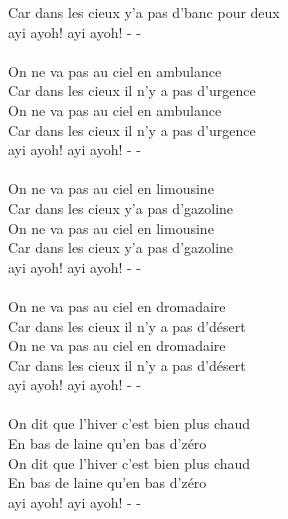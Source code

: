 Car dans les cieux y'a pas d'banc pour deux\\
ayi ayoh! ayi ayoh! - -\\\\
On ne va pas au ciel en ambulance\\
Car dans les cieux il n'y a pas d’urgence\\
On ne va pas au ciel en ambulance\\
Car dans les cieux il n'y a pas d’urgence\\
ayi ayoh! ayi ayoh! - -\\\\
On ne va pas au ciel en limousine\\
Car dans les cieux y'a pas d’gazoline\\
On ne va pas au ciel en limousine\\
Car dans les cieux y'a pas d’gazoline\\
ayi ayoh! ayi ayoh! - -\\\\
On ne va pas au ciel en dromadaire\\
Car dans les cieux il n'y a pas d’désert\\
On ne va pas au ciel en dromadaire\\
Car dans les cieux il n'y a pas d’désert\\
ayi ayoh! ayi ayoh! - -\\\\
On dit que l’hiver c'est bien plus chaud\\
En bas de laine qu'en bas d’zéro\\
On dit que l’hiver c'est bien plus chaud\\
En bas de laine qu'en bas d’zéro\\
ayi ayoh! ayi ayoh! - -
